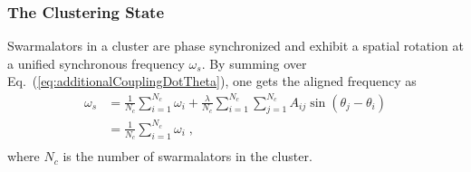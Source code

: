 \documentclass{article}
\begin{document}
\subsubsection{The Clustering State}
Swarmalators in a cluster are phase synchronized and exhibit a spatial rotation at a unified synchronous frequency $\omega_s$. By summing over Eq.~(\ref{eq:additionalCouplingDotTheta}), one gets the aligned frequency as
\begin{equation}
    \label{eq:clusterState}
    \begin{aligned}
        \omega _s&=\frac{1}{N_c}\sum_{i=1}^{N_c}{\omega _i}+\frac{\lambda}{N_c}\sum_{i=1}^{N_c}{\sum_{j=1}^{N_c}{A_{ij}\sin \left( \theta _j-\theta _i \right)}}\\
        &=\frac{1}{N_c}\sum_{i=1}^{N_c}{\omega _i}\;,\\
    \end{aligned}
\end{equation}
where $N_c$ is the number of swarmalators in the cluster.



\end{document}

